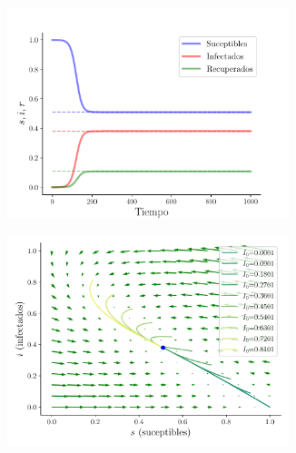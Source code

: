 \documentclass[twocolumn,aps,prl]{revtex4-1}
\begin{document}
\begin{figure}[ht!]
  \begin{subfigure}[b]{0.49\linewidth}
      \centering
      \includegraphics[width = 0.9\textwidth]{figuras/ex01-b-sir.pdf}
      \caption{}
      \label{fig:figuras/ex01-b-sir}
  \end{subfigure}\quad
  \begin{subfigure}[b]{0.49\linewidth}
      \centering
      \includegraphics[width = 0.9\textwidth]{figuras/ex01-b-vector.pdf}
      \caption{}
      \label{fig:figuras/ex01-b-vector}
  \end{subfigure}\quad


\end{figure}
\end{document}
